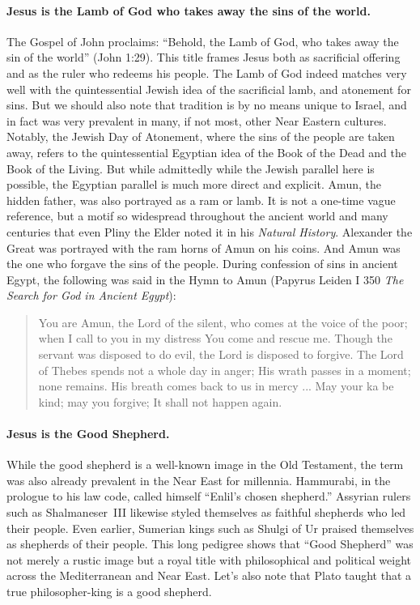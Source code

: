 \paragraph{Jesus is the Lamb of God who takes away the sins of the world.}\label{par:jesus-is-the-lamb-of-god-who-takes-away-the-sins-of-the-world.}
The Gospel of John proclaims: “Behold, the Lamb of God, who takes away the sin of the world” (John 1:29).
This title frames Jesus both as sacrificial offering and as the ruler who redeems his people.
The Lamb of God indeed matches very well with the quintessential Jewish idea of the sacrificial lamb, and atonement for sins.
But we should also note that tradition is by no means unique to Israel, and in fact was very prevalent in many, if not most, other Near Eastern cultures.
Notably, the Jewish Day of Atonement, where the sins of the people are taken away, refers to the quintessential Egyptian idea of the Book of the Dead and the Book of the Living.
But while admittedly while the Jewish parallel here is possible, the Egyptian parallel is much more direct and explicit.
Amun, the hidden father, was also portrayed as a ram or lamb.
It is not a one-time vague reference, but a motif so widespread throughout the ancient world and many centuries that even Pliny the Elder noted it in his \emph{Natural History}.
Alexander the Great was portrayed with the ram horns of Amun on his coins.
And Amun was the one who forgave the sins of the people.
During confession of sins in ancient Egypt, the following was said in the Hymn to Amun (Papyrus Leiden I 350 \emph{The Search for God in Ancient Egypt}):
\begin{quote}
    You are Amun, the Lord of the silent, who comes at the voice of the poor; when I call to you in my distress You come and rescue me.
    Though the servant was disposed to do evil, the Lord is disposed to forgive.
    The Lord of Thebes spends not a whole day in anger;
    His wrath passes in a moment; none remains.
    His breath comes back to us in mercy ...
    May your ka be kind; may you forgive; It shall not happen again.
\end{quote}

\paragraph{Jesus is the Good Shepherd.}\label{par:jesus-is-the-good-shepherd.}
While the good shepherd is a well-known image in the Old Testament, the term was also already prevalent in the Near East for millennia.
Hammurabi, in the prologue to his law code, called himself “Enlil’s chosen shepherd.”
Assyrian rulers such as Shalmaneser~III likewise styled themselves as faithful shepherds who led their people.
Even earlier, Sumerian kings such as Shulgi of Ur praised themselves as shepherds of their people.
This long pedigree shows that “Good Shepherd” was not merely a rustic image but a royal title with philosophical and political weight across the Mediterranean and Near East.
Let's also note that Plato taught that a true philosopher-king is a good shepherd.

